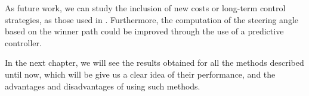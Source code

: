 As future work, we can study the inclusion of new costs or long-term control strategies, as those used in \cite{werling2010optimal}. Furthermore, the computation of the steering angle based on the winner path could be improved through the use of a predictive controller.

In the next chapter, we will see the results obtained for all the methods described until now, which will be give us a clear idea of their performance, and the advantages and disadvantages of using such methods.


